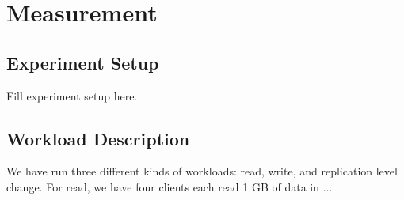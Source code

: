 \section{Measurement}
\label{section:measurement}


\subsection{\bf Experiment Setup}

Fill experiment setup here.

\subsection{\bf Workload Description}
We have run three different kinds of workloads: read, write, and replication level change. For read, we have four clients each read 1 GB of data in ...



